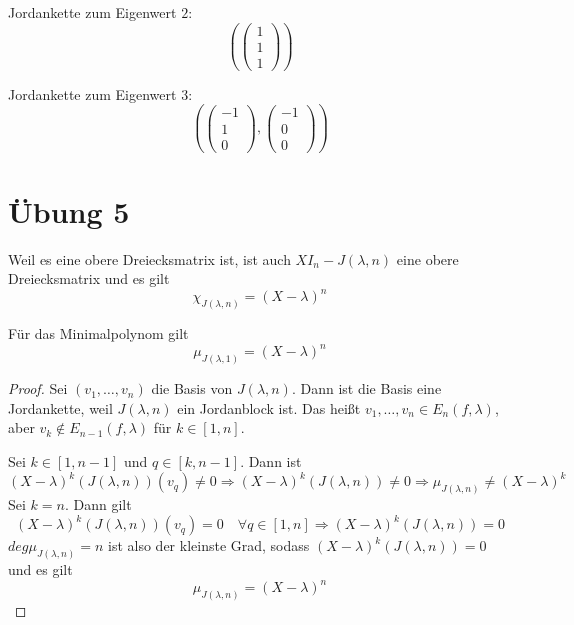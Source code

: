 \documentclass[10pt,a4paper]{article}
\begin{document}
Jordankette zum Eigenwert $2$:
\begin{equation}
\left(
\begin{pmatrix}
1\\1\\1
\end{pmatrix}
\right)
\end{equation}

Jordankette zum Eigenwert $3$:
\begin{equation}
\left(
\begin{pmatrix}
-1\\1\\0
\end{pmatrix},
\begin{pmatrix}
-1\\0\\0
\end{pmatrix}
\right)
\end{equation}

\section*{Übung 5}

Weil es eine obere Dreiecksmatrix ist, ist auch $XI_{n} - J(\lambda, n)$ eine obere Dreiecksmatrix und es gilt
\begin{equation}
\chi_{J(\lambda, n)} = (X - \lambda)^{n}
\end{equation}

Für das Minimalpolynom gilt
\begin{equation}
\mu_{J(\lambda, 1)} = (X - \lambda)^{n}
\end{equation}

\begin{proof}
Sei $(v_{1}, \dots, v_{n})$ die Basis von $J(\lambda, n)$.
Dann ist die Basis eine Jordankette, weil $J(\lambda, n)$ ein Jordanblock ist.
Das heißt $v_{1}, \dots, v_{n} \in E_{n}(f, \lambda)$, aber $v_{k} \notin E_{n - 1}(f, \lambda)$ für $k \in [1, n]$.

Sei $k \in [1, n - 1]$ und $q \in [k, n - 1]$.
Dann ist
\begin{equation}
(X - \lambda)^{k}(J(\lambda, n))(v_{q}) \ne 0 \Rightarrow (X - \lambda)^{k}(J(\lambda, n)) \ne 0 \Rightarrow \mu_{J(\lambda, n)} \ne (X - \lambda)^{k}
\end{equation}
Sei $k = n$.
Dann gilt
\begin{equation}
(X - \lambda)^{k}(J(\lambda, n))(v_{q}) = 0 \quad \forall q \in [1, n] \Rightarrow (X - \lambda)^{k}(J(\lambda, n)) = 0
\end{equation}
$deg \mu_{J(\lambda, n)} = n$ ist also der kleinste Grad, sodass $(X - \lambda)^{k}(J(\lambda, n)) = 0$ und es gilt
\begin{equation}
\mu_{J(\lambda, n)} = (X - \lambda)^{n}
\end{equation}
\end{proof}
\end{document}
